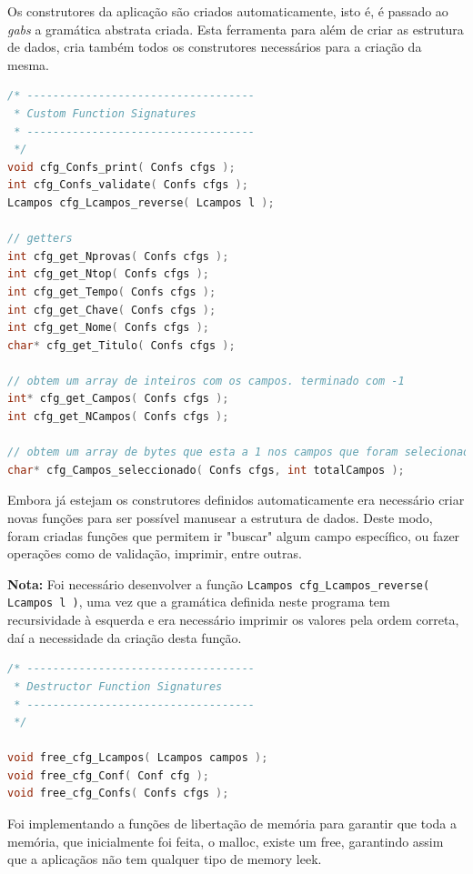 \documentclass[11pt, a4paper, oneside]{article}
\begin{document}
Os construtores da aplicação são criados automaticamente, isto é, é passado ao \textit{gabs} a gramática abstrata criada. Esta ferramenta para além de criar as estrutura de dados, cria também todos os construtores necessários para a criação da mesma.

\begin{lstlisting}[language=C, caption={Funções do ficheiro de configuração.}]
/* -----------------------------------
 * Custom Function Signatures
 * -----------------------------------
 */
void cfg_Confs_print( Confs cfgs );
int cfg_Confs_validate( Confs cfgs );
Lcampos cfg_Lcampos_reverse( Lcampos l );

// getters
int cfg_get_Nprovas( Confs cfgs );
int cfg_get_Ntop( Confs cfgs );
int cfg_get_Tempo( Confs cfgs );
int cfg_get_Chave( Confs cfgs );
int cfg_get_Nome( Confs cfgs );
char* cfg_get_Titulo( Confs cfgs );

// obtem um array de inteiros com os campos. terminado com -1
int* cfg_get_Campos( Confs cfgs );
int cfg_get_NCampos( Confs cfgs );

// obtem um array de bytes que esta a 1 nos campos que foram selecionados
char* cfg_Campos_seleccionado( Confs cfgs, int totalCampos );
\end{lstlisting} 

Embora já estejam os construtores definidos automaticamente era necessário criar novas funções para ser possível manusear a estrutura de dados. Deste modo, foram criadas funções que permitem ir "buscar" algum campo específico, ou fazer operações como de validação, imprimir, entre outras.

\textbf{Nota:} Foi necessário desenvolver a função \texttt{Lcampos cfg\_Lcampos\_reverse( Lcampos l )}, uma vez que a gramática definida neste programa tem recursividade à esquerda e era necessário imprimir os valores pela ordem correta, daí a necessidade da criação desta função.

\begin{lstlisting}[language=C, caption={Funções de libertação de memória.}]
/* -----------------------------------
 * Destructor Function Signatures
 * -----------------------------------
 */

void free_cfg_Lcampos( Lcampos campos );
void free_cfg_Conf( Conf cfg );
void free_cfg_Confs( Confs cfgs );
\end{lstlisting} 

Foi implementando a funções de libertação de memória para garantir que toda a memória, que inicialmente foi feita, o malloc, existe um free, garantindo assim que a aplicaçãos não tem qualquer tipo de memory leek.
\end{document}
